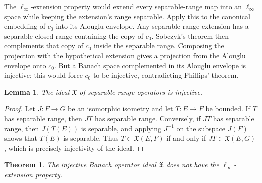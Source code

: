 \documentclass[11pt]{article}
\newtheorem{theorem}{Theorem}
\newtheorem{lemma}{Lemma}
\newcommand{\cX}{\mathfrak X}
\newcommand{\czero}{c_0}
\begin{document}
The $\ell_\infty$-extension property would extend every separable-range map into an $\ell_\infty$ space while keeping the extension's range separable. Apply this to the canonical embedding of $\czero$ into its Alouglu envelope. Any separable-range extension has a separable closed range containing the copy of $\czero$. Sobczyk's theorem then complements that copy of $\czero$ inside the separable range. Composing the projection with the hypothetical extension gives a projection from the Alouglu envelope onto $\czero$. But a Banach space complemented in its Alouglu envelope is injective; this would force $\czero$ to be injective, contradicting Phillips' theorem.

\begin{lemma}
The ideal $\cX$ of separable-range operators is injective.
\end{lemma}

\begin{proof}
Let $J:F\to G$ be an isomorphic isometry and let $T:E\to F$ be bounded. If $T$ has separable range, then $JT$ has separable range. Conversely, if $JT$ has separable range, then $J(T(E))$ is separable, and applying $J^{-1}$ on the subspace $J(F)$ shows that $T(E)$ is separable. Thus $T\in\cX(E,F)$ if and only if $JT\in\cX(E,G)$, which is precisely injectivity of the ideal.
\end{proof}

\begin{theorem}
The injective Banach operator ideal $\cX$ does not have the $\ell_\infty$-extension property.
\end{theorem}
\end{document}
